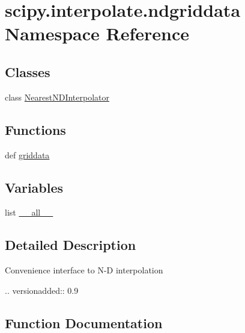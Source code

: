 \hypertarget{namespacescipy_1_1interpolate_1_1ndgriddata}{}\section{scipy.\+interpolate.\+ndgriddata Namespace Reference}
\label{namespacescipy_1_1interpolate_1_1ndgriddata}
\subsection*{Classes}
\begin{DoxyCompactItemize}
\item 
class \hyperlink{classscipy_1_1interpolate_1_1ndgriddata_1_1NearestNDInterpolator}{Nearest\+N\+D\+Interpolator}
\end{DoxyCompactItemize}
\subsection*{Functions}
\begin{DoxyCompactItemize}
\item 
def \hyperlink{namespacescipy_1_1interpolate_1_1ndgriddata_a54e71d1a8228c0b20907945cbe3ea304}{griddata}
\end{DoxyCompactItemize}
\subsection*{Variables}
\begin{DoxyCompactItemize}
\item 
list \hyperlink{namespacescipy_1_1interpolate_1_1ndgriddata_a5936f26badb01747d761062cf6f2a369}{\+\_\+\+\_\+all\+\_\+\+\_\+}
\end{DoxyCompactItemize}


\subsection{Detailed Description}
\begin{DoxyVerb}Convenience interface to N-D interpolation

.. versionadded:: 0.9\end{DoxyVerb}
 

\subsection{Function Documentation}
\hypertarget{namespacescipy_1_1interpolate_1_1ndgriddata_a54e71d1a8228c0b20907945cbe3ea304}{}
